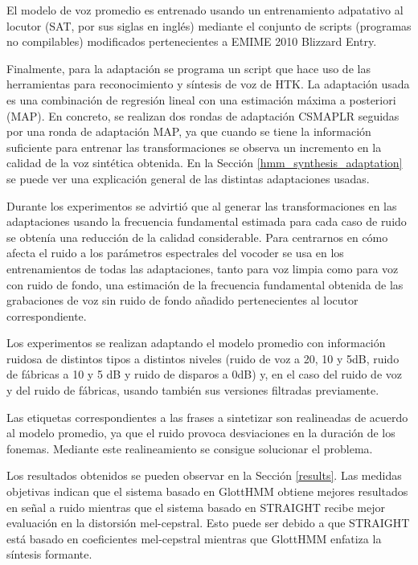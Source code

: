 \begin{resumencastellano}[english]
El modelo de voz promedio es entrenado usando un entrenamiento adpatativo al locutor (SAT, por sus siglas en ingl\'es) mediante el conjunto de scripts (programas no compilables) modificados pertenecientes a EMIME 2010 Blizzard Entry.

Finalmente, para la adaptaci\'on se programa un script que hace uso de las herramientas para reconocimiento y s\'intesis de voz de HTK.
%
La adaptaci\'on usada es una combinaci\'on de regresi\'on lineal con una estimaci\'on m\'axima a posteriori (MAP).
%
En concreto, se realizan dos rondas de adaptaci\'on CSMAPLR seguidas por una ronda de adaptaci\'on MAP, ya que cuando se tiene la informaci\'on suficiente para entrenar las transformaciones se observa un incremento en la calidad de la voz sint\'etica obtenida.
%
En la Secci\'on \ref{hmm_synthesis_adaptation} se puede ver una explicaci\'on general de las distintas adaptaciones usadas.

Durante los experimentos se advirti\'o que al generar las transformaciones en las adaptaciones usando la frecuencia fundamental estimada para cada caso de ruido se obten\'ia una reducci\'on de la calidad considerable.
%
Para centrarnos en c\'omo afecta el ruido a los par\'ametros espectrales del vocoder se usa en los entrenamientos de todas las adaptaciones, tanto para voz limpia como para voz con ruido de fondo, una estimaci\'on de la frecuencia fundamental obtenida de las grabaciones de voz sin ruido de fondo a\~nadido pertenecientes al locutor correspondiente.

Los experimentos se realizan adaptando el modelo promedio con informaci\'on ruidosa de distintos tipos a distintos niveles (ruido de voz a 20, 10 y 5dB, ruido de f\'abricas a 10 y 5 dB y ruido de disparos a 0dB) y, en el caso del ruido de voz y del ruido de f\'abricas, usando tambi\'en sus versiones filtradas previamente.

Las etiquetas correspondientes a las frases a sintetizar son realineadas de acuerdo al modelo promedio, ya que el ruido provoca desviaciones en la duraci\'on de los fonemas.
%
Mediante este realineamiento se consigue solucionar el problema.

Los resultados obtenidos se pueden observar en la Secci\'on \ref{results}.
%
Las medidas objetivas indican que el sistema basado en GlottHMM obtiene mejores resultados en se\~nal a ruido mientras que el sistema basado en STRAIGHT recibe mejor evaluaci\'on en la distorsi\'on mel-cepstral.
%
Esto puede ser debido a que STRAIGHT est\'a basado en coeficientes mel-cepstral mientras que GlottHMM enfatiza la s\'intesis formante.


\end{resumencastellano}
